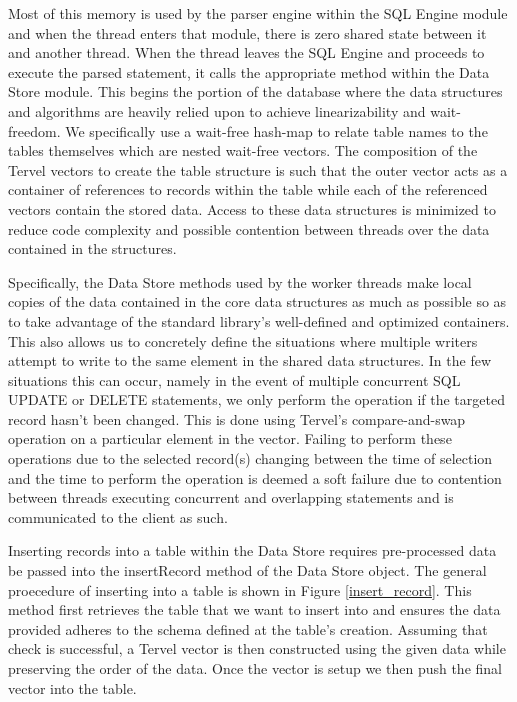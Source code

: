 \documentclass[letter,11pt]{article}
\begin{document}
Most of this memory is used by the parser engine within the SQL Engine module and when the 
thread enters that module, there is zero shared state between it and another thread. When the thread
leaves the SQL Engine and proceeds to execute the parsed statement, it calls the appropriate
method within the Data Store module. This begins the portion of the database where the data 
structures and algorithms are heavily relied upon to achieve linearizability and wait-freedom.
We specifically use a wait-free hash-map to relate table names to the tables themselves which are nested
wait-free vectors. The composition of the Tervel vectors to create the table structure is such that the outer
vector acts as a container of references to records within the table while each of the referenced vectors
contain the stored data. Access to these data structures is minimized to reduce code complexity and 
possible contention between threads over the data contained in the structures.
\par\vspace{\baselineskip}
Specifically, the Data Store methods used by the worker threads make local copies of the data contained
in the core data structures as much as possible so as to take advantage of the standard library's
well-defined and optimized containers. This also allows us to concretely define the situations where 
multiple writers attempt to write to the same element in the shared data structures. In the few situations
this can occur, namely in the event of multiple concurrent SQL UPDATE or DELETE statements, we only perform
the operation if the targeted record hasn't been changed. This is done using Tervel's compare-and-swap 
operation on a particular element in the vector. Failing to perform these operations due to the 
selected record(s) changing between the time of selection and the time to perform the operation
is deemed a soft failure due to contention between threads executing concurrent and overlapping statements
and is communicated to the client as such.
\par\vspace{\baselineskip}
Inserting records into a table within the Data Store requires pre-processed data be passed
into the insertRecord method of the Data Store object. The general proecedure of inserting
into a table is shown in Figure \ref{insert_record}. This method first retrieves the table 
that we want to insert into and ensures the data provided adheres to the schema defined 
at the table's creation. Assuming that check is successful, a Tervel vector is then 
constructed using the given data while preserving the order of the data. Once the vector 
is setup we then push the final vector into the table.
\end{document}
